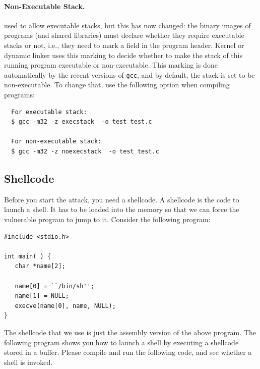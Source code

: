 \paragraph{Non-Executable Stack.} \ubuntu used to allow executable stacks, but
this has now changed: the binary images of programs (and shared libraries) 
must declare whether they require executable stacks or not, i.e., they need to 
mark a field in the program header. Kernel or dynamic linker uses this marking
to decide whether to make the stack of this running program executable or 
non-executable. This marking is done automatically by the 
recent versions of {\tt gcc}, and by default, the stack is set to 
be non-executable.  To change that, use the following option when compiling
programs:
\begin{verbatim}
  For executable stack:
  $ gcc -m32 -z execstack  -o test test.c

  For non-executable stack:
  $ gcc -m32 -z noexecstack  -o test test.c
\end{verbatim}



\subsection{Shellcode}
Before you start the attack, you need a shellcode. A shellcode is the code to
launch a shell. It has to be loaded into the memory so that we can force the
vulnerable program to jump to it. Consider the following program:

\begin{verbatim}
#include <stdio.h>

int main( ) {
   char *name[2];

   name[0] = ``/bin/sh'';
   name[1] = NULL;
   execve(name[0], name, NULL);
}
\end{verbatim}


The shellcode that we use is just the assembly version of the above program.
The following program shows you how to launch a shell by executing 
a shellcode stored in a buffer.
Please compile and run the following code, and see whether a
shell is invoked. 

